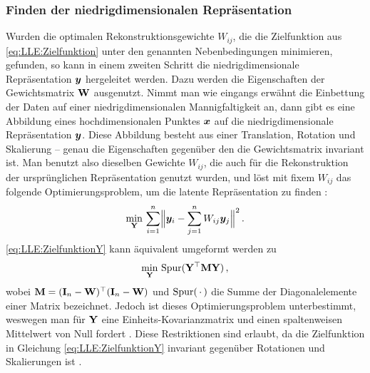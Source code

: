 \subsubsection{Finden der niedrigdimensionalen Repräsentation}
\label{ch:MethodenDerDimRed:statistisch:LLE:FindenDerRepr}
Wurden die optimalen Rekonstruktionsgewichte $W_{ij}$, die die Zielfunktion aus
\eqref{eq:LLE:Zielfunktion} unter den genannten Nebenbedingungen minimieren, gefunden, so kann in einem zweiten Schritt die niedrigdimensionale Repräsentation $\bm{y}$ hergeleitet werden. Dazu werden die Eigenschaften der Gewichtsmatrix $\mathbf{W}$ ausgenutzt. Nimmt man wie eingangs erwähnt die Einbettung der Daten auf einer niedrigdimensionalen Mannigfaltigkeit an, dann gibt es eine Abbildung eines hochdimensionalen Punktes $\bm{x}$ auf die niedrigdimensionale Repräsentation $\bm{y}$. Diese Abbildung besteht aus einer Translation, Rotation und Skalierung -- genau die Eigenschaften gegenüber den die Gewichtsmatrix invariant ist. Man benutzt also dieselben Gewichte $W_{ij}$, die auch für die Rekonstruktion der ursprünglichen Repräsentation genutzt wurden, und löst mit fixem $W_{ij}$ das folgende Optimierungsproblem, um die latente Repräsentation zu finden \parencite[2324]{Roweis.2000}:
\begin{equation}
	\label{eq:LLE:ZielfunktionY}
	\min_{\mat{Y}}\, \sum_{i = 1}^n \norm[\Big]{\vect{y}_i - \sum_{j = 1}^n W_{ij}\vect{y}_j}^2 \, .
\end{equation}
\eqref{eq:LLE:ZielfunktionY} kann äquivalent umgeformt werden zu \parencite[4]{Ghojogh.2020}
\begin{equation}
	\min_{\mathbf{Y}}\, \operatorname{Spur}(\mathbf{Y}^\top \mathbf{M} \mathbf{Y}) \, ,
\end{equation}
wobei $\mathbf{M} = (\mathbf{I}_n - \mathbf{W})^\top (\mathbf{I}_n - \mathbf{W})$ und $\operatorname{Spur}(\,\cdot\,)$ die Summe der Diagonalelemente einer Matrix bezeichnet. Jedoch ist dieses Optimierungsproblem unterbestimmt, weswegen man für $\mathbf{Y}$ eine Einheits-Kovarianzmatrix und einen spaltenweisen Mittelwert von Null fordert \parencite[11]{Saul.2000}. Diese Restriktionen sind erlaubt, da die Zielfunktion in Gleichung
\eqref{eq:LLE:ZielfunktionY} invariant gegenüber Rotationen und Skalierungen ist \parencite[2326]{Roweis.2000}.

